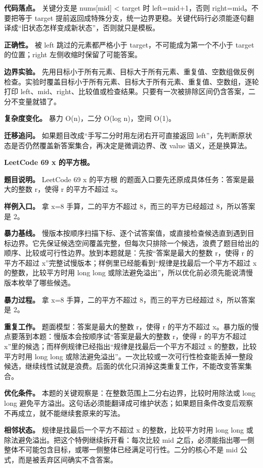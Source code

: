 \textbf{代码落点。} 关键分支是 nums[mid] < target 时 left=mid+1，否则 right=mid。不要把等于 target 提前返回成特殊分支，统一边界更稳。关键代码行必须能逐句翻译成“旧状态怎样变成新状态”，否则就只是模板。

\textbf{正确性。} 被 left 跳过的元素都严格小于 target，不可能成为第一个不小于 target 的位置；right 左侧收缩时保留了可能答案。

\textbf{边界实验。} 先用目标小于所有元素、目标大于所有元素、重复值、空数组做反例检查。实验时覆盖目标小于所有元素、目标大于所有元素、重复值、空数组，逐轮打印 left、mid、right、比较值或检查结果。只要有一次被排除区间仍含答案，二分不变量就错了。

\textbf{复杂度变化。} 暴力 O(n)，二分 O(log n)，空间 O(1)。

\textbf{迁移追问。} 如果题目改成“手写二分时用左闭右开可直接返回 left”，先判断原状态是否仍然覆盖新答案集合，再决定是微调边界、改 value 语义，还是换算法。

\noindent\textbf{LeetCode 69 x 的平方根。}

\textbf{题目说明。} LeetCode 69 x 的平方根 的题面入口要先还原成具体任务：答案是最大的整数 r，使得 r 的平方不超过 x。

\textbf{样例入口。} 拿 x=8 手算，二的平方不超过 8，而三的平方已经超过 8，所以答案是 2。

\textbf{暴力基线。} 慢版本按顺序扫描下标、逐个试答案值，或直接检查候选直到遇到目标边界。它先保证候选空间覆盖完整，但每次只排除一个候选，浪费了题目给出的顺序、比较或可行性边界。放到本题就是：先按“答案是最大的整数 r，使得 r 的平方不超过 x”完整试慢版本；样例里已经能看到“规律是找最后一个平方不超过 x 的整数，比较平方时用 long long 或除法避免溢出”，所以优化前必须先能说清慢版本枚举了哪些候选。

\textbf{暴力过程。} 拿 x=8 手算，二的平方不超过 8，而三的平方已经超过 8，所以答案是 2。

\textbf{重复工作。} 题面模型：答案是最大的整数 r，使得 r 的平方不超过 x。暴力版的慢点要落到本题：慢版本会按顺序试“答案是最大的整数 r，使得 r 的平方不超过 x”里的候选；而样例规律已经指出“规律是找最后一个平方不超过 x 的整数，比较平方时用 long long 或除法避免溢出”。一次比较或一次可行性检查能丢掉一整段候选，继续线性试就是浪费。后面的优化只消掉这类重复工作，不能改变答案集合。

\textbf{优化条件。} 本题的关键观察是：在整数范围上二分右边界，比较时用除法或 long long 避免平方溢出。这句话必须能翻译成可维护状态；如果题目条件改变后观察不再成立，就不能继续套原来的写法。

\textbf{相邻状态。} 规律是找最后一个平方不超过 x 的整数，比较平方时用 long long 或除法避免溢出。把这个特例继续拆开看：每次比较 mid 之后，必须能指出哪一侧整体不可能包含目标，或哪一侧整体已经满足可行性。二分的核心不是 mid 公式，而是被丢弃区间确实不含答案。

